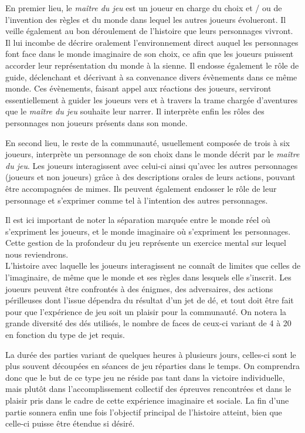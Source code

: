 En premier lieu, le \textit{maître du jeu} est un joueur en charge du choix et  / ou de l'invention des règles et du monde dans lequel les autres joueurs évolueront. Il veille également au bon déroulement de l'histoire que leurs personnages vivront. Il lui incombe de décrire oralement l'environnement direct auquel les personnages font face dans le monde imaginaire de son choix, ce afin que les joueurs puissent accorder leur représentation du monde à la sienne. Il endosse également le rôle de guide, déclenchant et décrivant à sa convenance divers évènements dans ce même monde. Ces évènements, faisant appel aux réactions des joueurs, serviront essentiellement à guider les joueurs vers et à travers la trame chargée d'aventures que le \textit{maître du jeu} souhaite leur narrer. Il interprète enfin les rôles des personnages non joueurs présents dans son monde.

En second lieu, le reste de la communauté, usuellement composée de trois à six joueurs, interprète un personnage de son choix dans le monde décrit par le \textit{maître du jeu}. Les joueurs interagissent avec celui-ci ainsi qu'avec les autres personnages (joueurs et non joueurs) grâce à des descriptions orales de leurs actions, pouvant être accompagnées de mimes. Ils peuvent également endosser le rôle de leur personnage et s'exprimer comme tel à l'intention des autres personnages.

Il est ici important de noter la séparation marquée entre le monde réel où s'expriment les joueurs, et le monde imaginaire où s'expriment les personnages. Cette gestion de la profondeur du jeu représente un exercice mental sur lequel nous reviendrons.\\


L'histoire avec laquelle les joueurs interagissent ne connaît de limites que celles de l'imaginaire, de même que le monde et ses règles dans lesquels elle s'inscrit. Les joueurs peuvent être confrontés à des énigmes, des adversaires, des actions périlleuses dont l'issue dépendra du résultat d'un jet de dé, et tout doit être fait pour que l'expérience de jeu soit un plaisir pour la communauté. On notera la grande diversité des dés utilisés, le nombre de faces de ceux-ci variant de 4 à 20 en fonction du type de jet requis.

La durée des parties variant de quelques heures à plusieurs jours, celles-ci sont le plus souvent découpées en séances de jeu réparties dans le temps. On comprendra donc que le but de ce type jeu ne réside pas tant dans la victoire individuelle, mais plutôt dans l'accomplissement collectif des épreuves rencontrées et dans le plaisir pris dans le cadre de cette expérience imaginaire et sociale. La fin d'une partie sonnera enfin une fois l'objectif principal de l'histoire atteint, bien que celle-ci puisse être étendue si désiré.\\


